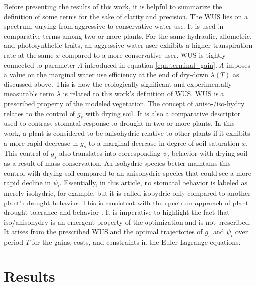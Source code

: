 \documentclass[utf8]{frontiersSCNS} %
\begin{document}
Before presenting the results of this work, it is helpful to summarize the definition of some terms for the sake of clarity and precision. The WUS lies on a spectrum varying from aggressive to conservative water use. It is used in comparative terms among two or more plants. For the same hydraulic, allometric, and photosynthetic traits, an aggressive water user exhibits a higher transpiration rate at the same $x$ compared to a more conservative user. WUS is tightly connected to parameter $\Lambda$ introduced in equation \ref{eqn:terminal_gain}. $\Lambda$ imposes a value on the marginal water use efficiency at the end of dry-down $\lambda(T)$ as discussed above. This is how the ecologically significant and experimentally measurable term $\lambda$ is related to this work's definition of WUS. WUS is a prescribed property of the modeled vegetation. The concept of aniso-/iso-hydry relates to the control of $g_s$ with drying soil. It is also a comparative descriptor used to contrast stomatal response to drought in two or more plants. In this work, a plant is considered to be anisohydric relative to other plants if it exhibits a more rapid decrease in $g_s$ to a marginal decrease in degree of soil saturation $x$. This control of $g_s$ also translates into corresponding $\psi_l$ behavior with drying soil as a result of mass conservation. An isohydric species better maintains this control with drying soil compared to an anisohydric species that could see a more rapid decline in $\psi_l$. Essentially, in this article, no stomatal behavior is labeled as merely isohydric, for example, but it is called isobydric only compared to another plant's drought behavior. This is consistent with the spectrum approach of plant drought tolerance and behavior \citep{martinezvilalta_new_2014, garciaforner_responses_2016}. It is imperative to highlight the fact that iso/anisohydry is an emergent property of the optimization and is not prescribed.  It arises from the prescribed WUS and the optimal trajectories of $g_s$ and $\psi_l$ over period $T$ for the gains, costs, and constraints in the Euler-Lagrange equations.

\section{Results}

\end{document}
